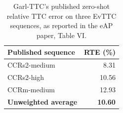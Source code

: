 \begin{table}[H]
\centering\small
\caption{Garl-TTC's published zero-shot relative TTC error on three EvTTC sequences, as reported in the eAP paper, Table VI. }
\label{tab:evttc-published-rte}
\begin{tabular}{@{}lr@{}}
\toprule
\textbf{Published sequence} & \textbf{RTE (\%)} \\
\midrule
CCRs2-medium & 8.31 \\
CCRs2-high & 10.56 \\
CCRm-medium & 12.93 \\
\textbf{Unweighted average} & \textbf{10.60} \\
\bottomrule
\end{tabular}
\end{table}
